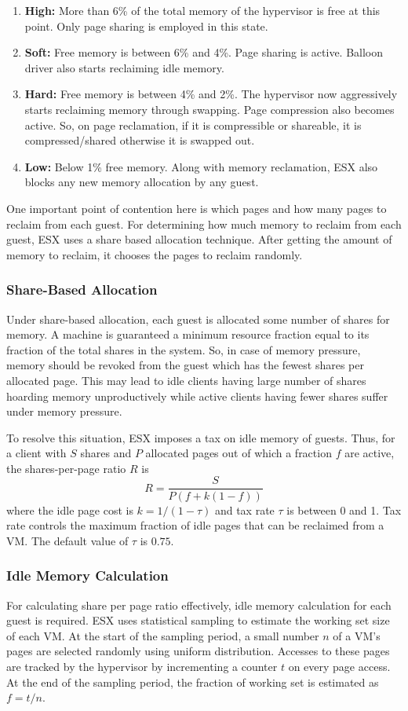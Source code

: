 \begin{enumerate}
\item \textbf{High:} More than 6\% of the total memory of the hypervisor is free at this point. Only page sharing is employed in this state.
\item \textbf{Soft:} Free memory is between 6\% and 4\%. Page sharing is active. Balloon driver also starts reclaiming idle memory.
\item \textbf{Hard:} Free memory is between 4\% and 2\%. The hypervisor now aggressively starts reclaiming memory through swapping. Page compression also becomes active. So, on page reclamation, if it is compressible or shareable, it is compressed/shared otherwise it is swapped out.
\item \textbf{Low:} Below 1\% free memory. Along with memory reclamation, ESX also blocks any new memory allocation by any guest.
\end{enumerate}

One important point of contention here is which pages and how many pages to reclaim from each guest. For determining how much memory to reclaim from each guest, ESX uses a share based allocation technique. After getting the amount of memory to reclaim, it chooses the pages to reclaim randomly.

\subsubsection{Share-Based Allocation}
Under share-based allocation, each guest is allocated some number of shares for memory. A machine is guaranteed a minimum resource fraction equal to its fraction of the total shares in the system. So, in case of memory pressure, memory should be revoked from the guest which has the fewest shares per allocated page. This may lead to idle clients having large number of shares hoarding memory unproductively while active clients having fewer shares suffer under memory pressure. 

To resolve this situation, ESX imposes a tax on idle memory of guests. Thus, for a client with $S$ shares and $P$ allocated pages  out of which a fraction $f$ are active, the shares-per-page ratio $R$ is
$$R = \frac{S}{P(f+k(1-f))}$$
where the idle page cost is $k=1/(1-\tau)$ and tax rate $\tau$ is between 0 and 1. Tax rate controls the maximum fraction of idle pages that can be reclaimed from a VM. The default value of $\tau$ is $0.75$.
\subsubsection{Idle Memory Calculation} \label{working-set}
For calculating share per page ratio effectively, idle memory calculation for each guest is required. ESX uses statistical sampling to estimate the working set size of each VM. At the start of the sampling period, a small number $n$ of a VM's pages are selected randomly using uniform distribution. Accesses to these pages are tracked by the hypervisor by incrementing a counter $t$ on every page access. At the end of the sampling period, the fraction of working set is estimated as $f=t/n$.

